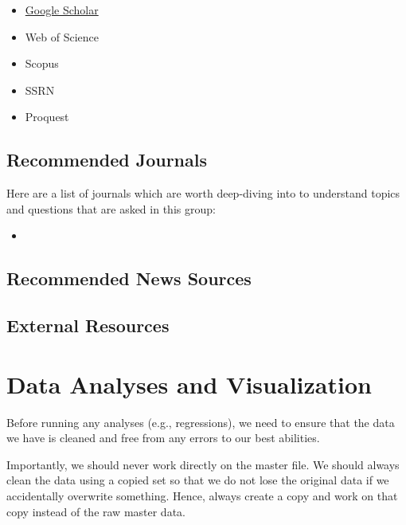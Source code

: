 \documentclass[
]{book}
\providecommand{\tightlist}{%
  \setlength{\itemsep}{0pt}\setlength{\parskip}{0pt}}
\begin{document}
\begin{itemize}
\tightlist
\item
  \href{https://scholar.google.com/}{Google Scholar}
\item
  Web of Science
\item
  Scopus
\item
  SSRN
\item
  Proquest
\end{itemize}

\hypertarget{recommended-journals}{%
\section{Recommended Journals}\label{recommended-journals}}

Here are a list of journals which are worth deep-diving into to understand topics and questions that are asked in this group:

\begin{itemize}
\tightlist
\item
\end{itemize}

\hypertarget{recommended-news-sources}{%
\section{Recommended News Sources}\label{recommended-news-sources}}

\hypertarget{external-resources-6}{%
\section{External Resources}\label{external-resources-6}}

\hypertarget{data-analyses-and-visualization}{%
\chapter{\texorpdfstring{\textbf{Data Analyses and Visualization}}{Data Analyses and Visualization}}\label{data-analyses-and-visualization}}

Before running any analyses (e.g., regressions), we need to ensure that the data we have is cleaned and free from any errors to our best abilities.

Importantly, we should never work directly on the master file. We should always clean the data using a copied set so that we do not lose the original data if we accidentally overwrite something. Hence, always create a copy and work on that copy instead of the raw master data.
\end{document}
